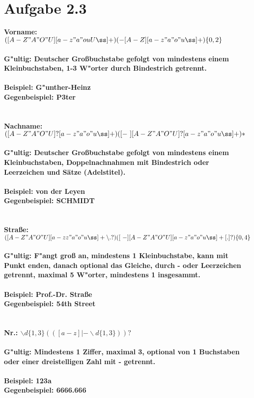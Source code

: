 \documentclass{article}
\date{}
\begin{document}
\section*{Aufgabe 2.3}

\bf{Vorname: }\normalfont $([A-Z"A"O"U][a-z"a"ouUß]+)(-[A-Z][a-z"a"o"uß]+)\lbrace0,2\rbrace$\\
\\
G"ultig: Deutscher Großbuchstabe gefolgt von mindestens einem Kleinbuchstaben, 1-3 W"orter durch Bindestrich getrennt.\\
\\
Beispiel: G"unther-Heinz\\
Gegenbeispiel: P3ter\\
\\
\\
\bf{Nachname: }\normalfont $([A-Z"A"O"U]?[a-z"a"o"uß]+)([-\text{ }][A-Z"A"O"U]?[a-z"a"o"uß]+)*$\\
\\
G"ultig: Deutscher Großbuchstabe gefolgt von mindestens einem Kleinbuchstaben, Doppelnachnahmen mit Bindestrich oder Leerzeichen und Sätze (Adelstitel).\\
\\
Beispiel: von der Leyen\\
Gegenbeispiel: SCHMIDT\\
\\
\\
\bf{Straße: }\normalfont $([A-Z"A"O"U][a-zz"a"o"uß]+\backslash.?)([\text{ }-][A-Z"A"O"U][a-z"a"o"uß]+[.]?)\lbrace0,4\rbrace$\\
\\
G"ultig: F"angt groß an, mindestens 1 Kleinbuchstabe, kann mit Punkt enden, danach optional das Gleiche, durch - oder Leerzeichen getrennt, maximal 5 W"orter, mindestens 1 insgesammt.\\
\\
Beispiel: Prof.-Dr. Straße\\
Gegenbeispiel: 54th Street\\
\\
\\
\bf{Nr.: }\normalfont $\backslash d\lbrace1,3\rbrace(([a-z]|-\backslash d\lbrace1,3\rbrace))?$\\
\\
G"ultig: Mindestens 1 Ziffer, maximal 3, optional von 1 Buchstaben oder einer dreistelligen Zahl mit - getrennt.\\
\\
Beispiel: 123a\\
Gegenbeispiel: 6666.666\\
\end{document}
